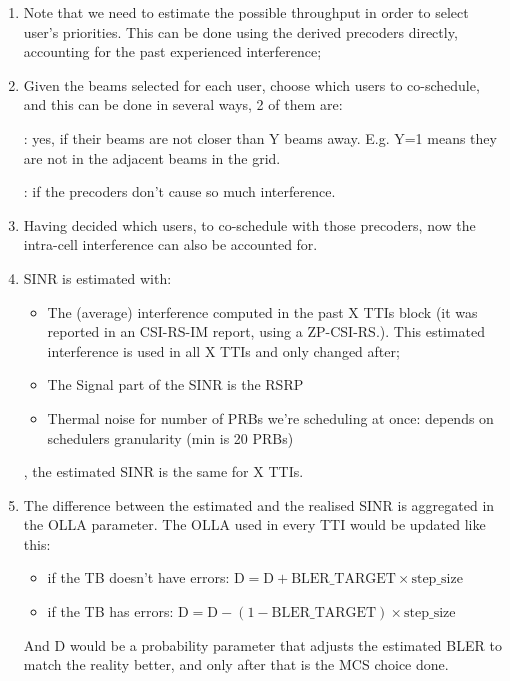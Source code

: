 \begin{enumerate}
    \item Note that we need to estimate the possible throughput in order to select user's priorities. This can be done using the derived precoders directly, accounting for the past experienced interference;

    \item Given the beams selected for each user, choose which users to co-schedule, and this can be done in several ways, 2 of them are:
    
    : yes, if their beams are not closer than Y beams away. E.g. Y=1 means they are not in the adjacent beams in the grid.

    : if the precoders don't cause so much interference.

    \item Having decided which users, to co-schedule with those precoders, now the intra-cell interference can also be accounted for. 
    \item SINR is estimated with:
        \begin{itemize}
            \item The (average) interference computed in the past X TTIs block (it was reported in an CSI-RS-IM report, using a ZP-CSI-RS.). This estimated interference is used in all X TTIs and only changed after;
            \item The Signal part of the SINR is the RSRP 
            \item Thermal noise for number of PRBs we're scheduling at once: depends on schedulers granularity (min is 20 PRBs)
        \end{itemize}
        , the estimated SINR is the same for X TTIs.
    \item The difference between the estimated and the realised SINR is aggregated in the \ac{OLLA} parameter.
    The \acs{OLLA} used in every TTI would be updated like this:
    \begin{itemize}
        \item if the \acs{TB} doesn't have errors: $\text{D} = \text{D} + \text{BLER\_TARGET} \times \text{step\_size}$
        \item if the \acs{TB} has errors: $\text{D} = \text{D} - (1 - \text{BLER\_TARGET}) \times \text{step\_size}$
    \end{itemize}
    And D would be a probability parameter that adjusts the estimated BLER to match the reality better, and only after that is the MCS choice done.
    

\end{enumerate}
